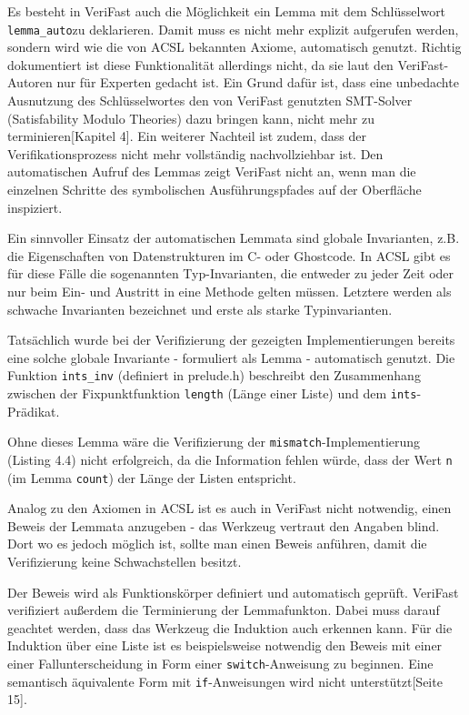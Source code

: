 Es besteht in VeriFast auch die Möglichkeit ein Lemma mit dem Schlüsselwort \lstinline{lemma_auto}zu deklarieren.
Damit muss es nicht mehr explizit aufgerufen werden, sondern wird wie die von ACSL bekannten Axiome, automatisch genutzt.
Richtig dokumentiert ist diese Funktionalität allerdings nicht, da sie laut den VeriFast-Autoren
nur für Experten gedacht ist. Ein Grund dafür ist, dass eine unbedachte Ausnutzung des Schlüsselwortes den von VeriFast genutzten 
SMT-Solver (Satisfability Modulo Theories) dazu bringen kann, nicht mehr zu terminieren\cite{jacobs-2010}[Kapitel 4]. Ein
weiterer Nachteil ist zudem, dass der Verifikationsprozess nicht mehr vollständig nachvollziehbar ist.
Den automatischen Aufruf des Lemmas zeigt VeriFast nicht an, wenn man die einzelnen
Schritte des symbolischen Ausführungspfades auf der Oberfläche inspiziert.

Ein sinnvoller Einsatz der automatischen Lemmata sind globale Invarianten, z.B. die Eigenschaften von Datenstrukturen
im C- oder Ghostcode. In ACSL gibt es für diese Fälle die sogenannten Typ-Invarianten, die entweder zu jeder Zeit oder
nur beim Ein- und Austritt in eine Methode gelten müssen. Letztere werden als schwache Invarianten bezeichnet und erste
als starke Typinvarianten.

Tatsächlich wurde bei der Verifizierung der gezeigten Implementierungen bereits eine solche
globale Invariante - formuliert als Lemma - automatisch genutzt. Die Funktion \lstinline{ints_inv}
(definiert in prelude.h) beschreibt den Zusammenhang zwischen der Fixpunktfunktion \texttt{length}
(Länge einer Liste) und dem \lstinline{ints}-Prädikat.



Ohne dieses Lemma wäre die Verifizierung der \lstinline{mismatch}-Implementierung (Listing 4.4)
nicht erfolgreich, da die Information fehlen würde, dass der Wert \lstinline{n} (im Lemma \lstinline{count})
der Länge der Listen entspricht.

Analog zu den Axiomen in ACSL ist es auch in VeriFast nicht notwendig, einen Beweis der Lemmata anzugeben -
das Werkzeug vertraut den Angaben blind. Dort wo es jedoch möglich ist, sollte man einen Beweis anführen,
damit die Verifizierung keine Schwachstellen besitzt.

Der Beweis wird als Funktionskörper definiert und automatisch geprüft. VeriFast verifiziert außerdem die
Terminierung der Lemmafunkton. 
Dabei muss darauf geachtet werden, dass das Werkzeug die Induktion auch erkennen kann. Für die Induktion 
über eine Liste ist es beispielsweise notwendig den Beweis mit einer 
einer Fallunterscheidung in Form einer \texttt{switch}-Anweisung zu beginnen. Eine semantisch äquivalente Form mit \texttt{if}-Anweisungen wird 
nicht unterstützt\cite{jacobs-tutorial}[Seite 15].

